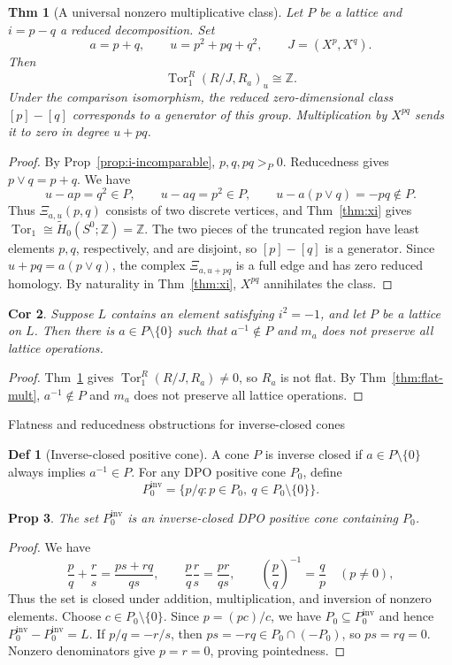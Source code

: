 \documentclass[10pt,letterpaper]{amsart}
\makeatletter
\numberwithin{equation}{section}
\newtheorem{thm}{Thm}[section]
\newtheorem{prop}[thm]{Prop}
\newtheorem{cor}[thm]{Cor}
\theoremstyle{definition}
\newtheorem{defn}{Def}[section]
\newcommand{\Z}{\mathbb Z}
\newcommand{\Tor}{\operatorname{Tor}}
\def\subsection{\@startsection{subsection}{2}
  \z@{.9\linespacing\@plus.3\linespacing}{.4\linespacing}
  {\normalfont\fontsize{11.5}{14}\selectfont\bfseries\boldmath\raggedright}}
\makeatother
\begin{document}
\begin{thm}[A universal nonzero multiplicative class]\label{thm:universal-class}
Let $P$ be a lattice and $i=p-q$ a reduced decomposition. Set
\[
a=p+q,\qquad u=p^2+pq+q^2,\qquad J=(X^p,X^q).
\]
Then
\[
\Tor_1^R(R/J,R_a)_u\cong\Z.
\]
Under the comparison isomorphism, the reduced zero-dimensional class $[p]-[q]$ corresponds to a generator of this group. Multiplication by $X^{pq}$ sends it to zero in degree $u+pq$.
\end{thm}
\begin{proof}
By Prop~\ref{prop:i-incomparable}, $p,q,pq>_P0$. Reducedness gives $p\vee q=p+q$. We have
\[
u-ap=q^2\in P,\qquad u-aq=p^2\in P,\qquad
u-a(p\vee q)=-pq\notin P.
\]
Thus $\Xi_{a,u}(p,q)$ consists of two discrete vertices, and Thm~\ref{thm:xi} gives $\Tor_1\cong\widetilde H_0(S^0;\Z)=\Z$.
The two pieces of the truncated region have least elements $p,q$, respectively, and are disjoint, so $[p]-[q]$ is a generator.
Since $u+pq=a(p\vee q)$, the complex $\Xi_{a,u+pq}$ is a full edge and has zero reduced homology. By naturality in Thm~\ref{thm:xi}, $X^{pq}$ annihilates the class.
\end{proof}

\begin{cor}\label{cor:universal-nonflat}
Suppose $L$ contains an element satisfying $i^2=-1$, and let $P$ be a lattice on $L$. Then there is $a\in P\setminus\{0\}$ such that $a^{-1}\notin P$ and $m_a$ does not preserve all lattice operations.
\end{cor}
\begin{proof}
Thm~\ref{thm:universal-class} gives $\Tor_1^R(R/J,R_a)\ne0$, so $R_a$ is not flat. By Thm~\ref{thm:flat-mult}, $a^{-1}\notin P$ and $m_a$ does not preserve all lattice operations.
\end{proof}

\subsection{Flatness and reducedness obstructions for inverse-closed cones}
\begin{defn}[Inverse-closed positive cone]\label{def:inverse-closed}
A cone $P$ is inverse closed if $a\in P\setminus\{0\}$ always implies $a^{-1}\in P$. For any DPO positive cone $P_0$, define
\[
P_0^{\mathrm{inv}}=\{p/q:p\in P_0,\ q\in P_0\setminus\{0\}\}.
\]
\end{defn}

\begin{prop}\label{prop:inverse-extension}
The set $P_0^{\mathrm{inv}}$ is an inverse-closed DPO positive cone containing $P_0$.
\end{prop}
\begin{proof}
We have
\[
\frac pq+\frac rs=\frac{ps+rq}{qs},\qquad
\frac pq\frac rs=\frac{pr}{qs},\qquad
\left(\frac pq\right)^{-1}=\frac qp\quad(p\ne0),
\]
Thus the set is closed under addition, multiplication, and inversion of nonzero elements. Choose $c\in P_0\setminus\{0\}$. Since $p=(pc)/c$, we have $P_0\subseteq P_0^{\mathrm{inv}}$ and hence $P_0^{\mathrm{inv}}-P_0^{\mathrm{inv}}=L$.
If $p/q=-r/s$, then $ps=-rq\in P_0\cap(-P_0)$, so $ps=rq=0$. Nonzero denominators give $p=r=0$, proving pointedness.
\end{proof}
\end{document}
